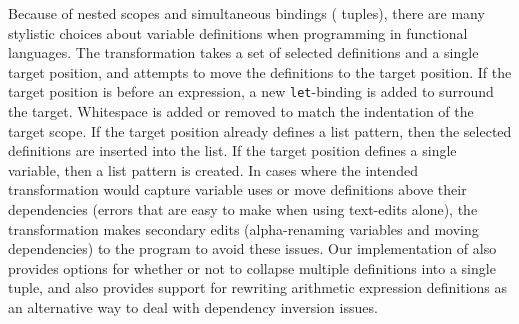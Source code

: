 
Because of nested scopes and simultaneous bindings (\ie{} tuples), there are
many stylistic choices about variable definitions when programming in
functional languages.
%
The  transformation takes a set of selected definitions %
and a single target position, and attempts to move the
definitions to the target position. If the target position is before
an expression, a new \verb+let+-binding is added to surround the target.
Whitespace is added or removed to match the indentation of the target
scope. If the target position already defines a
list pattern, then the selected definitions are inserted into the list.
If the target position defines a single variable,
then a list pattern is created.
In cases where the intended transformation would capture variable uses or move
definitions above their dependencies (errors that are easy to make when using
text-edits alone), the transformation makes secondary edits (alpha-renaming
variables and moving dependencies) to the program to avoid these issues.
Our implementation of  also provides options for whether or not to
collapse multiple definitions into a single tuple, and also provides support for
rewriting arithmetic expression definitions as an alternative way to deal with dependency
inversion issues.
